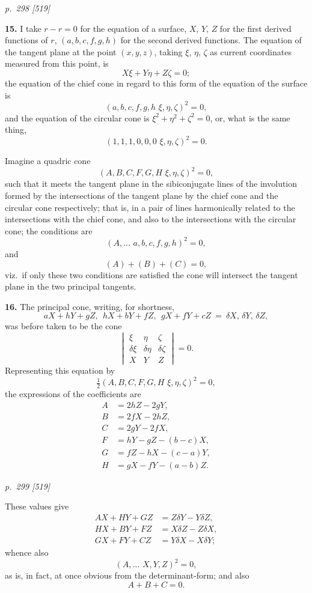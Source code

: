 \documentclass[11pt,a4paper]{article}
\theoremstyle{plain}
\begin{document}
\bigskip
\textit{p.~298 [519]}
\smallskip

\textbf{15.} I take $r - r = 0$ for the equation of a surface, $X$, $Y$, $Z$ for the first derived
functions of $r$, $(a, b, c, f, g, h)$ for the second derived functions.  The equation of the
tangent plane at the point $(x, y, z)$, taking $\xi$, $\eta$, $\zeta$ as current coordinates measured
from this point, is
\[
X\xi + Y\eta + Z\zeta = 0;
\]
the equation of the chief cone in regard to this form of the equation of the surface is
\[
(a, b, c, f, g, h\,\,\xi, \eta, \zeta)^2 = 0,
\]
and the equation of the circular cone is $\xi^2 + \eta^2 + \zeta^2 = 0$, or, what is the same thing,
\[
(1, 1, 1, 0, 0, 0\,\,\xi, \eta, \zeta)^2 = 0.
\]

Imagine a quadric cone
\[
(A, B, C, F, G, H\,\,\xi, \eta, \zeta)^2 = 0,
\]
such that it meets the tangent plane in the sibiconjugate lines of the involution
formed by the intersections of the tangent plane by the chief cone and the circular
cone respectively; that is, in a pair of lines harmonically related to the intersections
with the chief cone, and also to the intersections with the circular cone; the
conditions are
\[
(A, \ldots\,\,a, b, c, f, g, h)^2 = 0,
\]
and
\[
(A) + (B) + (C) = 0,
\]
viz.\ if only these two conditions are satisfied the cone will intersect the tangent plane
in the two principal tangents.

\textbf{16.} The principal cone, writing, for shortness,
\[
aX + hY + gZ,\ \ hX + bY + fZ,\ \ gX + fY + cZ\ =\ \delta X,\, \delta Y,\, \delta Z,
\]
was before taken to be the cone
\[
\begin{vmatrix}
\xi & \eta & \zeta \\
\delta\xi & \delta\eta & \delta\zeta \\
X & Y & Z
\end{vmatrix} = 0.
\]
Representing this equation by
\[
\tfrac{1}{2}(A, B, C, F, G, H\,\,\xi, \eta, \zeta)^2 = 0,
\]
the expressions of the coefficients are
\begin{align*}
A &= 2hZ - 2gY, \\
B &= 2fX - 2hZ, \\
C &= 2gY - 2fX, \\
F &= hY - gZ - (b - c)X, \\
G &= fZ - hX - (c - a)Y, \\
H &= gX - fY - (a - b)Z.
\end{align*}

\bigskip
\textit{p.~299 [519]}
\smallskip

These values give
\begin{align*}
AX + HY + GZ &= Z\delta Y - Y\delta Z, \\
HX + BY + FZ &= X\delta Z - Z\delta X, \\
GX + FY + CZ &= Y\delta X - X\delta Y;
\end{align*}
whence also
\[
(A, \ldots\,\,X, Y, Z)^2 = 0,
\]
as is, in fact, at once obvious from the determinant-form; and also
\[
A + B + C = 0.
\]
\end{document}
